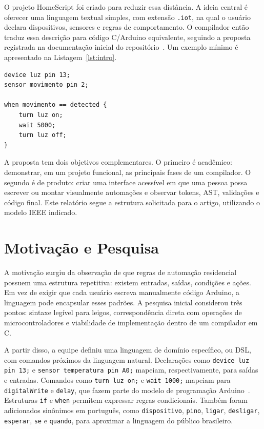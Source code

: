 \documentclass[conference]{IEEEtran}
\begin{document}
O projeto HomeScript foi criado para reduzir essa distância. A ideia central é oferecer uma linguagem textual simples, com extensão \texttt{.iot}, na qual o usuário declara dispositivos, sensores e regras de comportamento. O compilador então traduz essa descrição para código C/Arduino equivalente, seguindo a proposta registrada na documentação inicial do repositório~\cite{repo-readme,docs-def}. Um exemplo mínimo é apresentado na Listagem~\ref{lst:intro}.

\begin{lstlisting}[style=homescript,caption={Exemplo simples em HomeScript.},label={lst:intro}]
device luz pin 13;
sensor movimento pin 2;

when movimento == detected {
    turn luz on;
    wait 5000;
    turn luz off;
}
\end{lstlisting}

A proposta tem dois objetivos complementares. O primeiro é acadêmico: demonstrar, em um projeto funcional, as principais fases de um compilador. O segundo é de produto: criar uma interface acessível em que uma pessoa possa escrever ou montar visualmente automações e observar tokens, AST, validações e código final. Este relatório segue a estrutura solicitada para o artigo, utilizando o modelo IEEE indicado.

\section{Motivação e Pesquisa}

A motivação surgiu da observação de que regras de automação residencial possuem uma estrutura repetitiva: existem entradas, saídas, condições e ações. Em vez de exigir que cada usuário escreva manualmente código Arduino, a linguagem pode encapsular esses padrões. A pesquisa inicial considerou três pontos: sintaxe legível para leigos, correspondência direta com operações de microcontroladores e viabilidade de implementação dentro de um compilador em C.

A partir disso, a equipe definiu uma linguagem de domínio específico, ou DSL, com comandos próximos da linguagem natural. Declarações como \texttt{device luz pin 13;} e \texttt{sensor temperatura pin A0;} mapeiam, respectivamente, para saídas e entradas. Comandos como \texttt{turn luz on;} e \texttt{wait 1000;} mapeiam para \texttt{digitalWrite} e \texttt{delay}, que fazem parte do modelo de programação Arduino~\cite{arduino}. Estruturas \texttt{if} e \texttt{when} permitem expressar regras condicionais. Também foram adicionados sinônimos em português, como \texttt{dispositivo}, \texttt{pino}, \texttt{ligar}, \texttt{desligar}, \texttt{esperar}, \texttt{se} e \texttt{quando}, para aproximar a linguagem do público brasileiro.
\end{document}

